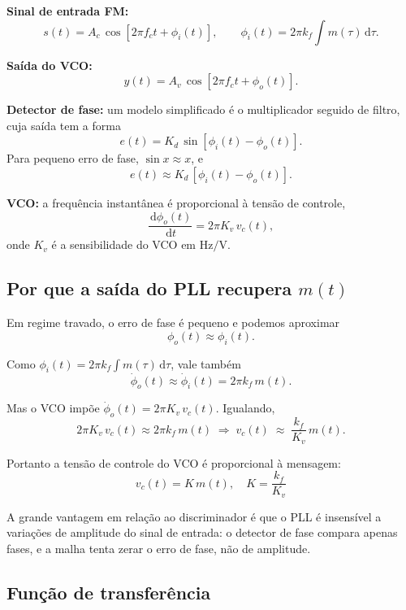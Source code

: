 \documentclass[11pt,a4paper]{article}
\newcommand{\dd}{\,\mathrm{d}}
\begin{document}
\begin{quadro}
\textbf{Sinal de entrada FM:}
\[
  s(t) = A_c\,\cos[2\pi f_c t + \phi_i(t)], \qquad
  \phi_i(t) = 2\pi k_f\!\!\int\! m(\tau)\dd\tau.
\]

\textbf{Saída do VCO:}
\[
  y(t) = A_v\,\cos[2\pi f_c t + \phi_o(t)].
\]

\textbf{Detector de fase:} um modelo simplificado é o multiplicador seguido de filtro, cuja saída tem a forma
\[
  e(t) = K_d\,\sin[\phi_i(t) - \phi_o(t)].
\]
Para pequeno erro de fase, $\sin x \approx x$, e
\[
  e(t) \approx K_d\,[\phi_i(t) - \phi_o(t)].
\]

\textbf{VCO:} a frequência instantânea é proporcional à tensão de controle,
\[
  \frac{\dd \phi_o(t)}{\dd t} = 2\pi K_v\,v_c(t),
\]
onde $K_v$ é a sensibilidade do VCO em $\mathrm{Hz/V}$.
\end{quadro}

\subsection{Por que a saída do PLL recupera $m(t)$}

\begin{quadro}
Em regime travado, o erro de fase é pequeno e podemos aproximar
\[
  \phi_o(t) \approx \phi_i(t).
\]

Como $\phi_i(t) = 2\pi k_f \int m(\tau)\dd\tau$, vale também
\[
  \dot\phi_o(t) \approx \dot\phi_i(t) = 2\pi k_f\,m(t).
\]

Mas o VCO impõe $\dot\phi_o(t) = 2\pi K_v\,v_c(t)$. Igualando,
\[
  2\pi K_v\,v_c(t) \approx 2\pi k_f\,m(t)
  \;\Longrightarrow\;
  v_c(t) \;\approx\; \frac{k_f}{K_v}\,m(t).
\]

Portanto a tensão de controle do VCO é proporcional à mensagem:
\[
  \boxed{\;v_c(t) = K\,m(t),\quad K = \frac{k_f}{K_v}\;}
\]
\end{quadro}

A grande vantagem em relação ao discriminador é que o PLL é insensível a variações de amplitude do sinal de entrada: o detector de fase compara apenas fases, e a malha tenta zerar o erro de fase, não de amplitude.

\subsection{Função de transferência}
\end{document}
